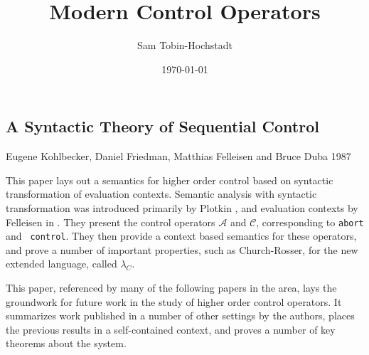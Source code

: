 \documentclass[12pt]{article}
\title{Modern Control Operators}
\author{Sam Tobin-Hochstadt}
\date{\today}
\begin{document}




\maketitle




\subsection*{A Syntactic Theory of Sequential Control} 
Eugene Kohlbecker, Daniel Friedman, Matthias Felleisen and Bruce Duba 1987
\cite{felleisen87syntactic}

This paper lays out a semantics for higher order control based on
syntactic transformation of evaluation contexts.  Semantic analysis
with syntactic transformation was introduced primarily by Plotkin
\cite{gdp:cbn-cbv}, and evaluation contexts by Felleisen in
\cite{felleisen86secd}.  They present the control operators ${\mathcal
A}$ and ${\mathcal C}$, corresponding to {\tt abort} and {\tt
control}.  They then provide a context based semantics for these
operators, and prove a number of important properties, such as
Church-Rosser, for the new extended language, called $\lambda_C$.

This paper, referenced by many of the following papers in the area, lays
the groundwork for future work in the study of higher order control
operators.  It summarizes work published in a number of other settings
by the authors, places the previous results in a self-contained
context, and proves a number of key theorems about the system.  
\end{document}
